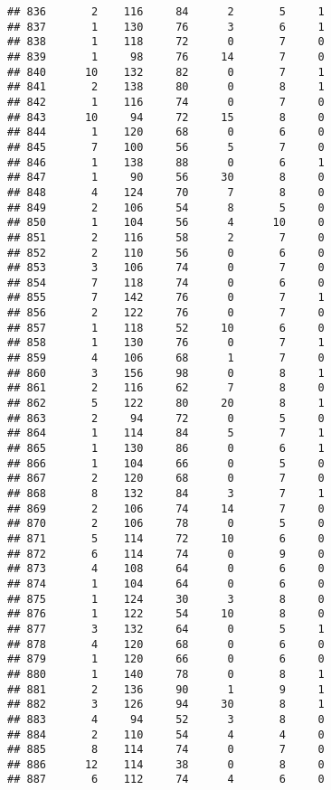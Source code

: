 \documentclass[
]{article}
\begin{document}
\begin{verbatim}
## 836       2    116     84      2       5     1
## 837       1    130     76      3       6     1
## 838       1    118     72      0       7     0
## 839       1     98     76     14       7     0
## 840      10    132     82      0       7     1
## 841       2    138     80      0       8     1
## 842       1    116     74      0       7     0
## 843      10     94     72     15       8     0
## 844       1    120     68      0       6     0
## 845       7    100     56      5       7     0
## 846       1    138     88      0       6     1
## 847       1     90     56     30       8     0
## 848       4    124     70      7       8     0
## 849       2    106     54      8       5     0
## 850       1    104     56      4      10     0
## 851       2    116     58      2       7     0
## 852       2    110     56      0       6     0
## 853       3    106     74      0       7     0
## 854       7    118     74      0       6     0
## 855       7    142     76      0       7     1
## 856       2    122     76      0       7     0
## 857       1    118     52     10       6     0
## 858       1    130     76      0       7     1
## 859       4    106     68      1       7     0
## 860       3    156     98      0       8     1
## 861       2    116     62      7       8     0
## 862       5    122     80     20       8     1
## 863       2     94     72      0       5     0
## 864       1    114     84      5       7     1
## 865       1    130     86      0       6     1
## 866       1    104     66      0       5     0
## 867       2    120     68      0       7     0
## 868       8    132     84      3       7     1
## 869       2    106     74     14       7     0
## 870       2    106     78      0       5     0
## 871       5    114     72     10       6     0
## 872       6    114     74      0       9     0
## 873       4    108     64      0       6     0
## 874       1    104     64      0       6     0
## 875       1    124     30      3       8     0
## 876       1    122     54     10       8     0
## 877       3    132     64      0       5     1
## 878       4    120     68      0       6     0
## 879       1    120     66      0       6     0
## 880       1    140     78      0       8     1
## 881       2    136     90      1       9     1
## 882       3    126     94     30       8     1
## 883       4     94     52      3       8     0
## 884       2    110     54      4       4     0
## 885       8    114     74      0       7     0
## 886      12    114     38      0       8     0
## 887       6    112     74      4       6     0

\end{verbatim}
\end{document}
